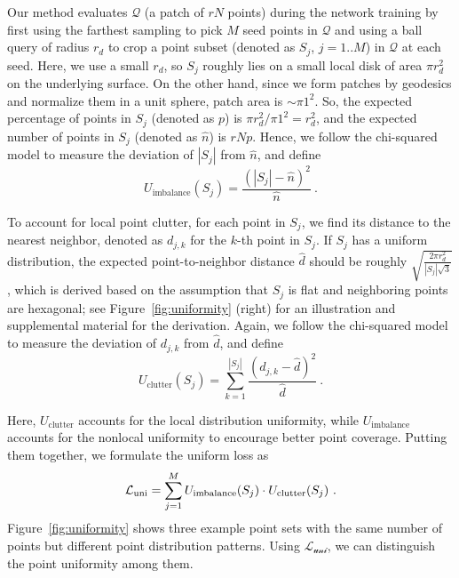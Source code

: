 Our method evaluates $\mathcal{Q}$ (a patch of $rN$ points) during the network training by first using the farthest sampling to pick $M$ seed points in $\mathcal{Q}$ and using a ball query of radius $r_d$ to crop a point subset (denoted as $S_j$, $j=1..M$) in $\mathcal{Q}$ at each seed.
Here, we use a small $r_d$, so $S_j$ roughly lies on a small local disk of area $\pi r_d^2$ on the underlying surface.
%
On the other hand, since we form patches by geodesics and normalize them in a unit sphere, patch area is $\sim$$\pi 1^2$.
So, the expected percentage of points in $S_j$ (denoted as $p$) is $\pi r_d^2 / \pi 1^2 = r_d^2$, and the expected number of points in $S_j$ (denoted as $\hat{n}$) is $rNp$.
%
Hence, we follow the chi-squared model to measure the deviation of $|S_j|$ from $\hat{n}$, and define
%
\begin{equation}
U_{\text{imbalance}}(S_j) = \frac{(|S_j|-\hat{n})^2}{\hat{n}} \ .
\end{equation}

To account for local point clutter, for each point in $S_j$, we find its distance to the nearest neighbor, denoted as $d_{j,k}$ for the $k$-th point in $S_j$.
If $S_j$ has a uniform distribution, the expected point-to-neighbor distance $\hat{d}$ should be roughly $\sqrt{\frac{2\pi r_d^2}{|S_j| \sqrt{3}}}$, which is derived based on the assumption that $S_j$ is flat and neighboring points are hexagonal; see Figure~\ref{fig:uniformity} (right) for an illustration and supplemental material for the derivation.
%
Again, we follow the chi-squared model to measure the deviation of $d_{j,k}$ from $\hat{d}$, and define
%
\begin{equation}
U_{\text{clutter}}(S_j) = \sum_{k=1}^{|S_j|} \frac{(d_{j,k}-\hat{d})^2}{\hat{d}} \ .
\end{equation}

Here, $U_{\text{clutter}}$ accounts for the local distribution uniformity, while $U_{\text{imbalance}}$ accounts for the nonlocal uniformity to encourage better point coverage.
Putting them together, we formulate the uniform loss as
%
\vspace*{-1.5mm}
\begin{equation}
\label{eq:uniform}
\mathcal{L_{\text{uni}}} = \sum_{j=1}^{M}U_{\text{imbalance}}(S_j) \cdot U_{\text{clutter}}(S_j) \ .
\vspace*{-1mm}
\end{equation}
%
Figure~\ref{fig:uniformity} shows three example point sets with the same number of points but different point distribution patterns.
Using $\mathcal{L_{\text{uni}}}$, we can distinguish the point uniformity among them.
%


